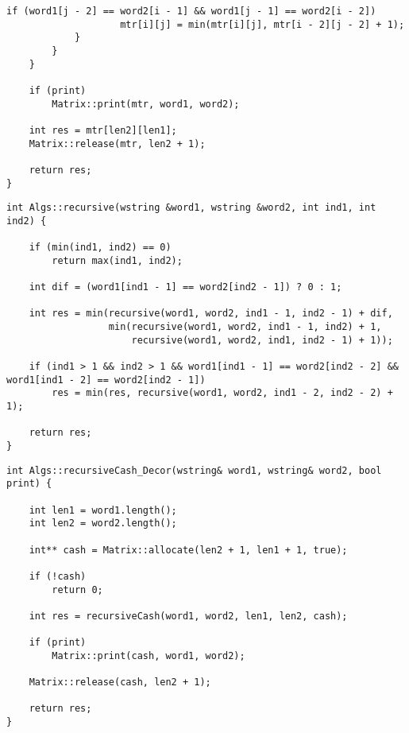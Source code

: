 \begin{lstlisting}[label=lst:dameray_lev_rec,caption=Функция нахождения расстояния Дамерау\,--\,Левенштейна с использованием матрицы (конец)]
                if (word1[j - 2] == word2[i - 1] && word1[j - 1] == word2[i - 2]) 
                    mtr[i][j] = min(mtr[i][j], mtr[i - 2][j - 2] + 1);
            }
        }
    }

    if (print)  
        Matrix::print(mtr, word1, word2);

    int res = mtr[len2][len1];
    Matrix::release(mtr, len2 + 1);

    return res;
}
\end{lstlisting}

\clearpage

\begin{lstlisting}[label=lst:dameray_lev_mtr,caption=Функция нахождения расстояния Дамерау\,--\,Левенштейна рекурсивно]
int Algs::recursive(wstring &word1, wstring &word2, int ind1, int ind2) {

    if (min(ind1, ind2) == 0)
        return max(ind1, ind2);

    int dif = (word1[ind1 - 1] == word2[ind2 - 1]) ? 0 : 1;

    int res = min(recursive(word1, word2, ind1 - 1, ind2 - 1) + dif,
                  min(recursive(word1, word2, ind1 - 1, ind2) + 1, 
                      recursive(word1, word2, ind1, ind2 - 1) + 1));

    if (ind1 > 1 && ind2 > 1 && word1[ind1 - 1] == word2[ind2 - 2] && word1[ind1 - 2] == word2[ind2 - 1])
        res = min(res, recursive(word1, word2, ind1 - 2, ind2 - 2) + 1);

    return res;
}
\end{lstlisting}

\clearpage

\begin{lstlisting}[label=lst:dameray_lev_rec_hash,caption=Функция вызова рекурсивного алгоритма c кешированием для поиска расстояния Дамерау\,--\,Левенштейна]
int Algs::recursiveCash_Decor(wstring& word1, wstring& word2, bool print) {

    int len1 = word1.length();
    int len2 = word2.length();

    int** cash = Matrix::allocate(len2 + 1, len1 + 1, true);

    if (!cash)
        return 0;

    int res = recursiveCash(word1, word2, len1, len2, cash);

    if (print)  
        Matrix::print(cash, word1, word2);

    Matrix::release(cash, len2 + 1);

    return res;
}
\end{lstlisting}

